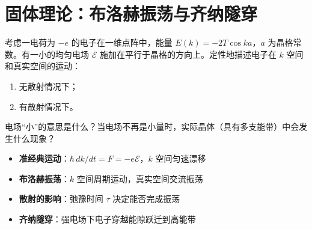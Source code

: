 \section{固体理论：布洛赫振荡与齐纳隧穿}
\label{sec:bloch-oscillation}

\begin{modelbox}[题目：一维晶格中电子在电场下的运动]
考虑一电荷为 $-e$ 的电子在一维点阵中，能量 $E(k)=-2T\cos ka$，$a$ 为晶格常数。有一小的均匀电场 $\mathcal{E}$ 施加在平行于晶格的方向上。定性地描述电子在 $k$ 空间和真实空间的运动：
\begin{enumerate}
    \item 无散射情况下；
    \item 有散射情况下。
\end{enumerate}
电场``小''的意思是什么？当电场不再是小量时，实际晶体（具有多支能带）中会发生什么现象？
\end{modelbox}

\begin{tipbox}[考点快速分析]
\begin{itemize}
    \item \textbf{准经典运动}：$\hbar\,dk/dt=F=-e\mathcal{E}$，$k$ 空间匀速漂移
    \item \textbf{布洛赫振荡}：$k$ 空间周期运动，真实空间交流振荡
    \item \textbf{散射的影响}：弛豫时间 $\tau$ 决定能否完成振荡
    \item \textbf{齐纳隧穿}：强电场下电子穿越能隙跃迁到高能带
\end{itemize}
\end{tipbox}

